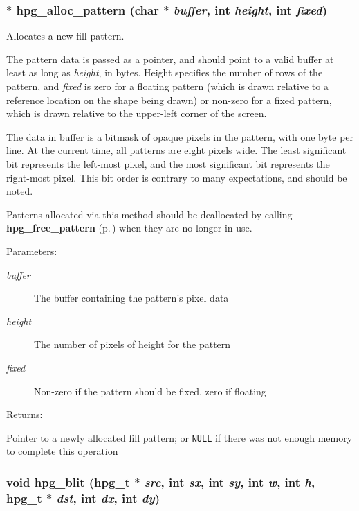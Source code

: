\subsubsection{$\ast$ hpg\_\-alloc\_\-pattern (char $\ast$ {\em buffer}, int {\em height}, int {\em fixed})}\label{hpgraphics_8h_a70}


Allocates a new fill pattern.

The pattern data is passed as a pointer, and should point to a valid buffer at least as long as {\em height}, in bytes. Height specifies the number of rows of the pattern, and {\em fixed} is zero for a floating pattern (which is drawn relative to a reference location on the shape being drawn) or non-zero for a fixed pattern, which is drawn relative to the upper-left corner of the screen.

The data in buffer is a bitmask of opaque pixels in the pattern, with one byte per line. At the current time, all patterns are eight pixels wide. The least significant bit represents the left-most pixel, and the most significant bit represents the right-most pixel. This bit order is contrary to many expectations, and should be noted.

Patterns allocated via this method should be deallocated by calling {\bf hpg\_\-free\_\-pattern} {\rm (p.\,\pageref{hpgraphics_8h_a71})} when they are no longer in use.\begin{Desc}
\item[Parameters: ]\par
\begin{description}
\item[{\em 
buffer}]The buffer containing the pattern's pixel data \item[{\em 
height}]The number of pixels of height for the pattern \item[{\em 
fixed}]Non-zero if the pattern should be fixed, zero if floating \end{description}
\end{Desc}
\begin{Desc}
\item[Returns: ]\par
Pointer to a newly allocated fill pattern; or {\tt NULL} if there was not enough memory to complete this operation \end{Desc}
\subsubsection{\setlength{\rightskip}{0pt plus 5cm}void hpg\_\-blit ({\bf hpg\_\-t} $\ast$ {\em src}, int {\em sx}, int {\em sy}, int {\em w}, int {\em h}, {\bf hpg\_\-t} $\ast$ {\em dst}, int {\em dx}, int {\em dy})}\label{hpgraphics_8h_a79}


